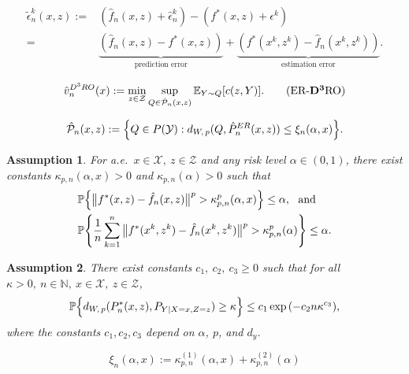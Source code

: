 \documentclass[10pt,a4paper]{amsart}
\newtheorem{assumption}{Assumption}
\begin{document}
\begin{align}
    \tilde{\epsilon}_n^k(x,z):=&(\hat{f}_n(x,z)+ \hat{\epsilon}_n^k)-(f^*(x,z)+\epsilon^k)\nonumber\\
    =& \underbrace{(\hat{f}_n(x,z)-f^*(x,z))}_{\text{prediction error}} + \underbrace{(f^*(x^k,z^k)-\hat{f}_n(x^k,z^k))}_{\text{estimation error}}. \label{eq:tilde-epsilon}
\end{align}

\begin{equation}\label{eq:main problem}
 \hat{v}_n^{D^3RO}(x) := \min_{z \in \mathcal{Z}} \sup_{Q \in \hat{\mathcal{P}}_n(x,z)} \mathbb{E}_{Y \sim Q} [c(z,Y)]. 
 \tag{\textbf{ER-$\mathbf{\rm{D^3}}$RO}}
\end{equation}

    \begin{equation} \label{eq:wass as}
        \hat{\mathcal{P}}_n(x,z):=\Bigl\{Q \in P(\mathcal{Y}): d_{W,\, p} (Q,\hat{P}_n^{ER}(x,z))\leq \xi_n(\alpha,x)\Bigr\}.
    \end{equation}

\begin{assumption}\label{ass:regression}
    For a.e.\ $x \in \mathcal{X},\ z \in \mathcal{Z}$ and any risk level $\alpha \in (0,1)$, there exist constants $\kappa_{p,n}(\alpha,x) > 0$ and $\kappa_{p,n}(\alpha) > 0$ such that  
    \begin{align}
        &\mathbb{P}\Bigl\{\big\|f^*(x,z)-\hat{f}_n(x,z)\big\|^p > \kappa_{p,n}^p(\alpha,x)\Bigr\} \leq \alpha, \ \ \text{and}\label{eq:condition2-1}
        \\
        &\mathbb{P}\Biggl\{\frac{1}{n}\sum_{k=1}^n \big\|f^*(x^k,z^k)-\hat{f}_n(x^k,z^k)\big\|^p > \kappa_{p,n}^p(\alpha)\Biggr\} \leq \alpha.\label{eq:condition2-2}
    \end{align}
\end{assumption}

    \begin{assumption}\label{prop: concentration}
    There exist constants $c_1,\ c_2,\ c_3\ge 0$ such that for all $\kappa>0, \ n\in\mathbb{N},\ x\in \mathcal{X},\ z\in\mathcal{Z}$,
    \begin{align}\label{eq:concentration}
    \mathbb{P} \Bigl\{d_{W,\, p}(P_n^*(x,z),P_{Y|X=x,Z=z}) \geq \kappa \Bigr\} \leq  c_1\exp{(-c_2n\kappa^{c_3})}, 
    \end{align}
where the constants $c_1,c_2,c_3$ depend on $\alpha$, $p$, and $d_y$. 
\end{assumption}

\begin{equation}\label{eq:radius def}
    \xi_n(\alpha,x) := \kappa_{p,n}^{(1)}(\alpha,x) + \kappa_{p,n}^{(2)}(\alpha)
\end{equation}
\end{document}
